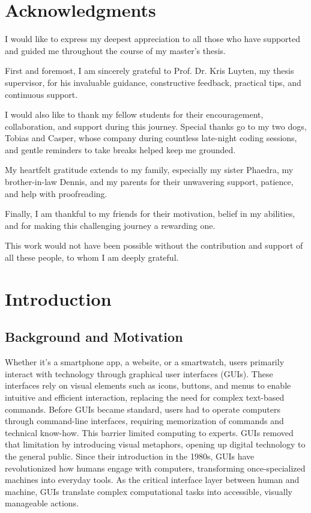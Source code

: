 \documentclass[openany]{book}
\begin{document}
\chapter*{Acknowledgments}
I would like to express my deepest appreciation to all those who have supported and guided me throughout the course of my master’s thesis.

First and foremost, I am sincerely grateful to Prof. Dr. Kris Luyten, my thesis supervisor, for his invaluable guidance, constructive feedback, practical tips, and continuous support.

I would also like to thank my fellow students for their encouragement, collaboration, and support during this journey. Special thanks go to my two dogs, Tobias and Casper, whose company during countless late-night coding sessions, and gentle reminders to take breaks helped keep me grounded.

My heartfelt gratitude extends to my family, especially my sister Phaedra, my brother-in-law Dennis, and my parents for their unwavering support, patience, and help with proofreading.

Finally, I am thankful to my friends for their motivation, belief in my abilities, and for making this challenging journey a rewarding one.

This work would not have been possible without the contribution and support of all these people, to whom I am deeply grateful.



\tableofcontents
\listoffigures
\listoftables

\glsaddall
\printglossary[type=\acronymtype, title=List of Abbreviations]

\chapter{Introduction}
\section{Background and Motivation}
Whether it's a smartphone app, a website, or a smartwatch, users primarily interact with technology through graphical user interfaces (GUIs). These interfaces rely on visual elements such as icons, buttons, and menus to enable intuitive and efficient interaction, replacing the need for complex text-based commands.
Before GUIs became standard, users had to operate computers through command-line interfaces, requiring memorization of commands and technical know-how. This barrier limited computing to experts. GUIs removed that limitation by introducing visual metaphors, opening up digital technology to the general public.
Since their introduction in the 1980s, GUIs have revolutionized how humans engage with computers, transforming once-specialized machines into everyday tools. As the critical interface layer between human and machine, GUIs translate complex computational tasks into accessible, visually manageable actions.
\end{document}
